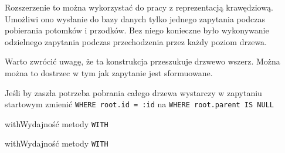 Rozszerzenie to można wykorzystać do pracy z reprezentacją krawędziową. 
Umożliwi ono wysłanie do bazy danych tylko jednego zapytania podczas pobierania potomków i przodków. 
Bez niego konieczne było wykonywanie odzielnego zapytania podczas przechodzenia przez każdy poziom drzewa.






Warto zwrócić uwagę, że ta konstrukcja przeszukuje drzwewo wszerz. Można można to dostrzec w tym jak zapytanie jest sformuowane. 

Jeśli by zaszła potrzeba pobrania całego drzewa wystarczy w zapytaniu startowym zmienić \texttt{WHERE root.id = :id} na \texttt{WHERE root.parent IS NULL}



\begin{qxtab}{with}{Wydajność metody \texttt{WITH}}
\end{qxtab}

\begin{qxfig}{with}{Wydajność metody \texttt{WITH}}
\end{qxfig}








